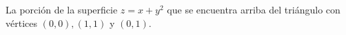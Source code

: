 \item La porción de la superficie $z = x + y^2$ que se encuentra arriba del triángulo con vértices $(0, 0), (1, 1)$ y $(0, 1)$.

